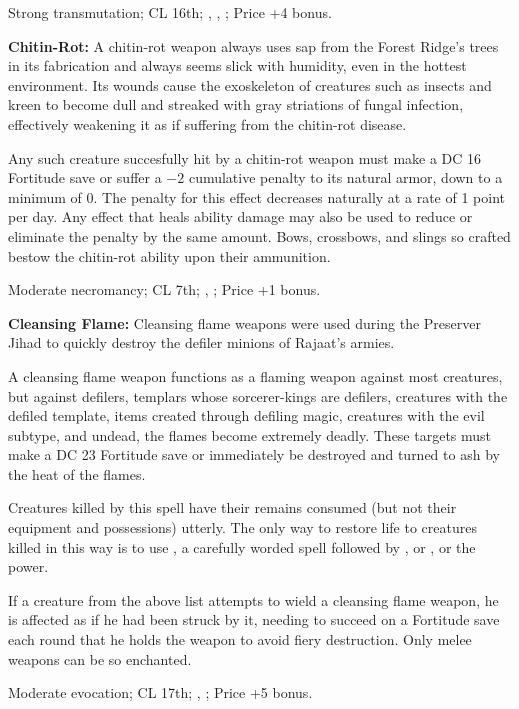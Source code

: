 Strong transmutation; CL 16th; , , ; Price +4 bonus.


\textbf{Chitin-Rot:} A chitin-rot weapon always uses sap from the Forest Ridge's trees in its fabrication and always seems slick with humidity, even in the hottest environment. Its wounds cause the exoskeleton of creatures such as insects and kreen to become dull and streaked with gray striations of fungal infection, effectively weakening it as if suffering from the chitin-rot disease.

Any such creature succesfully hit by a chitin-rot weapon must make a DC 16 Fortitude save or suffer a $-2$ cumulative penalty to its natural armor, down to a minimum of 0. The penalty for this effect decreases naturally at a rate of 1 point per day. Any effect that heals ability damage may also be used to reduce or eliminate the penalty by the same amount. Bows, crossbows, and slings so crafted bestow the chitin-rot ability upon their ammunition.

Moderate necromancy; CL 7th; , ; Price +1 bonus.


\textbf{Cleansing Flame:} Cleansing flame weapons were used during the Preserver Jihad to quickly destroy the defiler minions of Rajaat's armies.

A cleansing flame weapon functions as a flaming weapon against most creatures, but against defilers, templars whose sorcerer-kings are defilers, creatures with the defiled template, items created through defiling magic, creatures with the evil subtype, and undead, the flames become extremely deadly. These targets must make a DC 23 Fortitude save or immediately be destroyed and turned to ash by the heat of the flames.

Creatures killed by this spell have their remains consumed (but not their equipment and possessions) utterly. The only way to restore life to creatures killed in this way is to use , a carefully worded  spell followed by , or , or the  power.

If a creature from the above list attempts to wield a cleansing flame weapon, he is affected as if he had been struck by it, needing to succeed on a Fortitude save each round that he holds the weapon to avoid fiery destruction. Only melee weapons can be so enchanted.

Moderate evocation; CL 17th; , ; Price +5 bonus.


